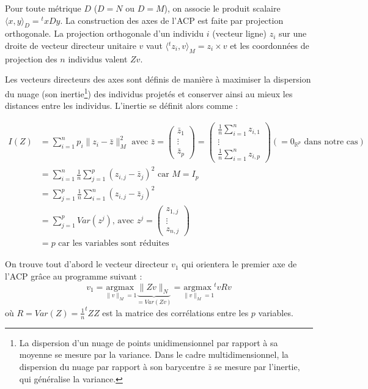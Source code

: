 \documentclass[11pt,french,french]{article}
\let\rmarkdownfootnote\footnote%
\def\footnote{\protect\rmarkdownfootnote}
\begin{document}
Pour toute métrique \(D\) (\(D=N\) ou \(D=M\)), on associe le produit
scalaire \(\langle x,y\rangle_{D} = {}^t\!xD y\). La construction des
axes de l'ACP est faite par projection orthogonale. La projection
orthogonale d'un individu \(i\) (vecteur ligne) \(z_i\) sur une droite
de vecteur directeur unitaire \(v\) vaut
\(\langle {}^tz_i,v\rangle_{M}=z_i\times v\) et les coordonnées de
projection des \(n\) individus valent \(Zv\).

Les vecteurs directeurs des axes sont définis de manière à maximiser la
dispersion du nuage (son inertie\footnote{La dispersion d'un nuage de
  points unidimensionnel par rapport à sa moyenne se mesure par la
  variance. Dans le cadre multidimensionnel, la dispersion du nuage par
  rapport à son barycentre \(\bar z\) se mesure par l'inertie, qui
  généralise la variance.}) des individus projetés et conserver ainsi au
mieux les distances entre les individus. L'inertie se définit alors
comme :

\begin{align*}
I(Z) &= \sum_{i = 1}^n p_i\|z_i-\bar{z}\|_M^2 \text{ avec }
  \bar{z} = 
  \begin{pmatrix}\bar z_{1} \\
    \vdots \\ \bar z_{p}
  \end{pmatrix} =
  \begin{pmatrix}\frac 1 n \sum_{i=1}^n z_{i,1} \\
    \vdots \\ \frac 1 n \sum_{i=1}^n z_{i,p}
  \end{pmatrix} (= 0_{\mathbb R^p}\text{ dans notre cas})
\\&=\sum_{i = 1}^n \frac 1 n \sum_{j=1}^p (z_{i,j} -  \bar{z}_j)^2  \text{ car }M=I_p 
\\&=\sum_{j = 1}^p \frac 1 n \sum_{i=1}^n (z_{i,j} -  \bar{z}_j)^2
\\&=\sum_{j = 1}^p Var(z^j)\text{, avec } z^j = 
  \begin{pmatrix} z_{1,j} \\ \vdots \\  z_{n,j} 
  \end{pmatrix}
\\ &= p \text{ car les variables sont réduites}
\end{align*}

On trouve tout d'abord le vecteur directeur \(v_1\) qui orientera le
premier axe de l'ACP grâce au programme suivant : \[
v_1 =\underset{\| v \|_M = 1}{\mathrm{argmax~}} 
\underbrace{\|Zv\|_N}_{=Var(Zv)} =\underset{\| v \|_M = 1}{\mathrm{argmax~}} ^t\!vR v 
\] où \(R = Var(Z) = \frac{1}{n} ^t\!Z Z\) est la matrice des
corrélations entre les \(p\) variables.
\end{document}
